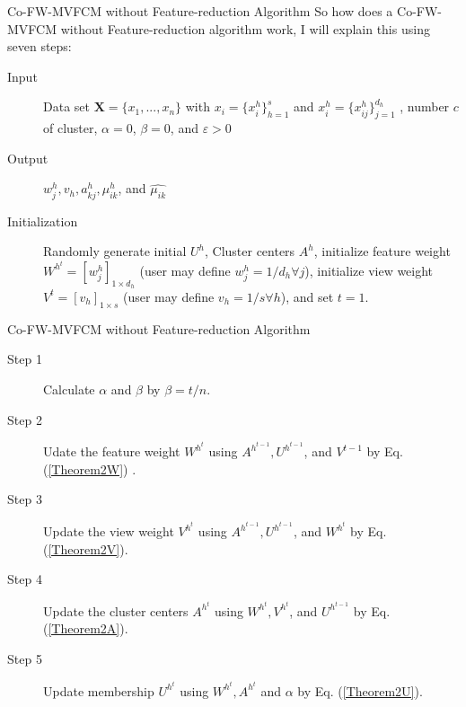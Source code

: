 \documentclass[compress,sky blue]{beamer}
\begin{document}
\begin{frame}{Co-FW-MVFCM without Feature-reduction Algorithm}
	\vspace{-0.3cm}	
So how does a Co-FW-MVFCM without Feature-reduction algorithm work, I will explain this using seven steps:
\begin{description}
\item [Input]
Data set $\boldsymbol{X}=\{ x_{1},. . .,x_{n} \}$ with $x_{i}=\{ x_{i}^{h} \}_{h=1}^{s}$ and $x_{i}^{h}=\{ x_{ij}^{h} \}_{j=1}^{d_{h}}$ , number $c$ of cluster, $\alpha=0$, $\beta=0$, and $\varepsilon>0$
\item[Output]
$w_{j}^{h}, v_{h}, a_{kj}^{h}, \mu_{ik}^{h}$, and $\hat{\mu_{ik}}$
\item[Initialization]
Randomly generate initial $U^{h}$, Cluster centers $A^{h}$, initialize feature weight $W^{h^{t}}=[w_{j}^{h}]_{1\times d_{h}}$ (user may define $w_{j}^{h}=1/d_{h}\forall j$), initialize view weight $V^{t}=[v_{h}]_{1\times s}$ (user may define $v_{h}=1/s\forall h$), and set $t=1.$
\end{description}
\end{frame}

\begin{frame}{Co-FW-MVFCM without Feature-reduction Algorithm}
	\vspace{-0.3cm}	
\begin{description}
\item[Step 1]
Calculate $\alpha$ and $\beta$  by $\beta=t/n.$
\item[Step 2]
Udate the feature weight $W^{h^{t}}$ using $A^{h^{t-1}}, U^{h^{t-1}}$, and $V^{t-1}$ by Eq. (\ref{Theorem2W}) .
\item[Step 3]
Update the view weight $V^{h^{t}}$ using $A^{h^{t-1}}, U^{h^{t-1}}$, and $W^{h^{t}}$ by Eq. (\ref{Theorem2V}).
\item[Step 4]
Update the cluster centers  $A^{h^{t}}$ using $ W^{h^{t}}, V^{h^{t}}$, and $U^{h^{t-1}}$ by Eq. (\ref{Theorem2A}).
\item[Step 5]
Update membership  $U^{h^{t}}$ using $W^{h^{t}},  A^{h^{t}}$  and $\alpha$ by Eq. (\ref{Theorem2U}).
\end{description}
\end{frame}
\end{document}

